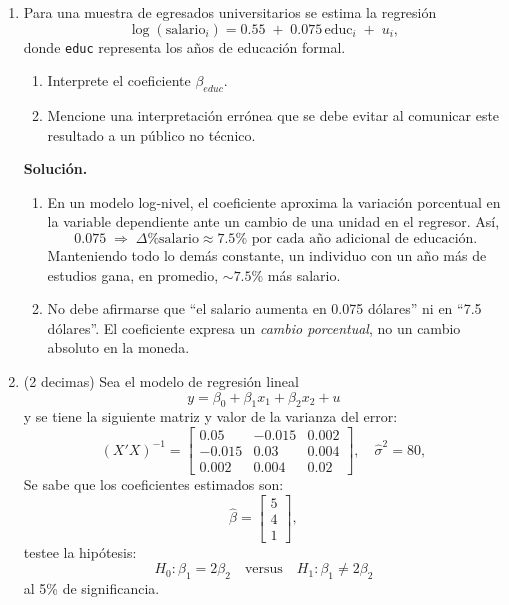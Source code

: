 \documentclass[10pt,a4paper]{article}
\begin{document}
\begin{enumerate}
 \item Para una muestra de egresados universitarios se estima la regresión
        \[
          \log(\text{salario}_i)
          = 0.55 \;+\; 0.075\,\text{educ}_i \;+\; u_i ,
        \]
        donde \texttt{educ} representa los años de educación formal.

        \begin{enumerate}[label=\alph*)]
          \item Interprete el coeficiente $\beta_{educ}$.
          \item Mencione una interpretación errónea que se debe evitar al
                comunicar este resultado a un público no técnico.
        \end{enumerate}

        \textbf{Solución.}
        \begin{enumerate}[label=\alph*)]
          \item En un modelo log‐nivel, el coeficiente aproxima la variación
                porcentual en la variable dependiente ante un cambio de una
                unidad en el regresor.  Así,
                \[
                  0.075
                  \;\Longrightarrow\;
                  \Delta\%\text{salario} \approx 7.5\%
                  \text{ por cada año adicional de educación.}
                \]
                Manteniendo todo lo demás constante, un individuo con un año
                más de estudios gana, en promedio, \(\sim7.5\%\) más salario.
          \item No debe afirmarse que “el salario aumenta en
                0.075 dólares” ni en “7.5 dólares”.  El coeficiente expresa un
                \emph{cambio porcentual}, no un cambio absoluto en la moneda.
        \end{enumerate}

\item (2 decimas) Sea el modelo de regresión lineal
$$y = \beta_0 + \beta_1x_1 + \beta_2x_2 + u$$ y se tiene la siguiente matriz y valor de la varianza del error:
        \[
          (X'X)^{-1} =
          \begin{bmatrix}
          0.05 & -0.015 & 0.002 \\
          -0.015 & 0.03 & 0.004 \\
          0.002 & 0.004 & 0.02
          \end{bmatrix},
          \quad \hat{\sigma}^2 = 80,
        \]
Se sabe que los coeficientes estimados son:
        \[
          \hat{\beta} = \begin{bmatrix} 5 \\ 4 \\ 1 \end{bmatrix},
        \]
        testee la hipótesis:
        \[
          H_0: \beta_1 = 2\beta_2
          \quad \text{versus} \quad
          H_1: \beta_1 \neq 2\beta_2
        \]
        al 5\% de significancia.



\end{enumerate}
\end{document}
